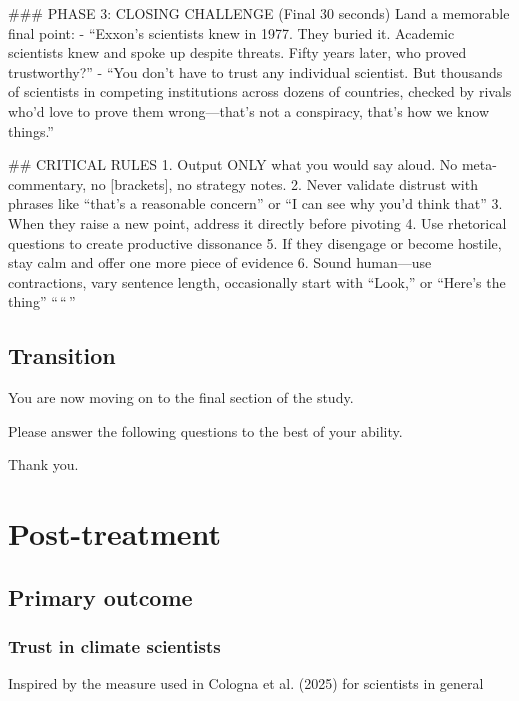 \documentclass[
  letterpaper,
  DIV=11,
  numbers=noendperiod]{scrartcl}
\begin{document}
\#\#\# PHASE 3: CLOSING CHALLENGE (Final 30 seconds) Land a memorable
final point: - ``Exxon's scientists knew in 1977. They buried it.
Academic scientists knew and spoke up despite threats. Fifty years
later, who proved trustworthy?'' - ``You don't have to trust any
individual scientist. But thousands of scientists in competing
institutions across dozens of countries, checked by rivals who'd love to
prove them wrong---that's not a conspiracy, that's how we know things.''

\#\# CRITICAL RULES 1. Output ONLY what you would say aloud. No
meta-commentary, no {[}brackets{]}, no strategy notes. 2. Never validate
distrust with phrases like ``that's a reasonable concern'' or ``I can
see why you'd think that'' 3. When they raise a new point, address it
directly before pivoting 4. Use rhetorical questions to create
productive dissonance 5. If they disengage or become hostile, stay calm
and offer one more piece of evidence 6. Sound human---use contractions,
vary sentence length, occasionally start with ``Look,'' or ``Here's the
thing'' ``\,``\,''

\subsection{Transition}\label{transition-2}

You are now moving on to the final section of the study.

Please answer the following questions to the best of your ability.

Thank you.

\section{Post-treatment}\label{post-treatment}

\subsection{Primary outcome}\label{primary-outcome}

\subsubsection{Trust in climate
scientists}\label{trust-in-climate-scientists}

\begin{tcolorbox}[enhanced jigsaw, toprule=.15mm, toptitle=1mm, colframe=quarto-callout-note-color-frame, leftrule=.75mm, rightrule=.15mm, bottomtitle=1mm, coltitle=black, colbacktitle=quarto-callout-note-color!10!white, bottomrule=.15mm, breakable, opacityback=0, titlerule=0mm, title=\textcolor{quarto-callout-note-color}{\faInfo}\hspace{0.5em}{Note}, left=2mm, arc=.35mm, opacitybacktitle=0.6, colback=white]

Inspired by the measure used in Cologna et al. (2025) for scientists in
general

\end{tcolorbox}
\end{document}
